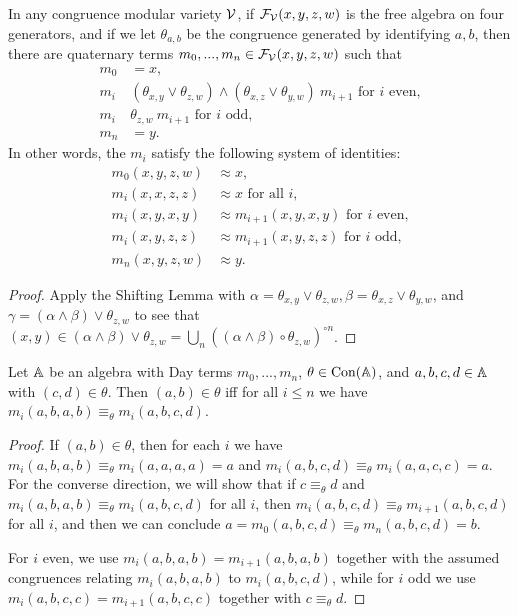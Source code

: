 \documentclass[letterpaper,11pt]{article}
\DeclareMathOperator{\Con}{Con}
\begin{document}
\begin{cor}\label{day-terms} In any congruence modular variety $\mathcal{V}$, if $\mathcal{F}_{\mathcal{V}}(x,y,z,w)$ is the free algebra on four generators, and if we let $\theta_{a,b}$ be the congruence generated by identifying $a,b$, then there are quaternary terms $m_0, ..., m_n \in \mathcal{F}_{\mathcal{V}}(x,y,z,w)$ such that
\begin{align*}
m_0 &= x,\\
m_i\ &(\theta_{x,y}\vee \theta_{z,w})\wedge (\theta_{x,z}\vee \theta_{y,w})\ m_{i+1}\text{ for $i$ even,}\\
m_i\ &\theta_{z,w}\ m_{i+1}\text{ for $i$ odd,}\\
m_n &= y.
\end{align*}
In other words, the $m_i$ satisfy the following system of identities:
\begin{align*}
m_0(x,y,z,w) &\approx x,\\
m_i(x,x,z,z) &\approx x\text{ for all $i$,}\\
m_i(x,y,x,y) &\approx m_{i+1}(x,y,x,y)\text{ for $i$ even,}\\
m_i(x,y,z,z) &\approx m_{i+1}(x,y,z,z)\text{ for $i$ odd,}\\
m_n(x,y,z,w) &\approx y.
\end{align*}
\end{cor}
\begin{proof} Apply the Shifting Lemma with $\alpha = \theta_{x,y}\vee \theta_{z,w}, \beta = \theta_{x,z}\vee \theta_{y,w}$, and $\gamma = (\alpha \wedge \beta)\vee \theta_{z,w}$ to see that $(x,y) \in (\alpha \wedge \beta)\vee \theta_{z,w} = \bigcup_n ((\alpha \wedge \beta)\circ \theta_{z,w})^{\circ n}$.
\end{proof}

\begin{lem}\label{day-congruence} Let $\mathbb{A}$ be an algebra with Day terms $m_0, ..., m_n$, $\theta \in \Con(\bA)$, and $a,b,c,d \in \mathbb{A}$ with $(c,d) \in \theta$. Then $(a,b) \in \theta$ iff for all $i \le n$ we have $m_i(a,b,a,b) \equiv_\theta m_i(a,b,c,d)$.
\end{lem}
\begin{proof} If $(a,b) \in \theta$, then for each $i$ we have $m_i(a,b,a,b) \equiv_\theta m_i(a,a,a,a) = a$ and $m_i(a,b,c,d) \equiv_\theta m_i(a,a,c,c) = a$. For the converse direction, we will show that if $c \equiv_\theta d$ and $m_i(a,b,a,b) \equiv_\theta m_i(a,b,c,d)$ for all $i$, then $m_i(a,b,c,d) \equiv_\theta m_{i+1}(a,b,c,d)$ for all $i$, and then we can conclude $a = m_0(a,b,c,d) \equiv_\theta m_n(a,b,c,d) = b$.

For $i$ even, we use $m_i(a,b,a,b) = m_{i+1}(a,b,a,b)$ together with the assumed congruences relating $m_i(a,b,a,b)$ to $m_i(a,b,c,d)$, while for $i$ odd we use $m_i(a,b,c,c) = m_{i+1}(a,b,c,c)$ together with $c \equiv_\theta d$.
\end{proof}
\end{document}
